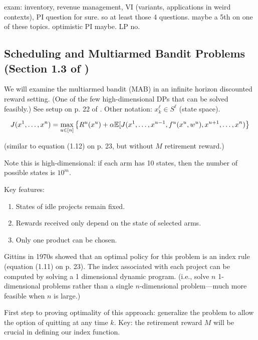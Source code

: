 exam: inventory, revenue management, VI (variants, applications in weird contexts), PI question for sure. so at least those 4 questions. maybe a 5th on one of these topics. optimistic PI maybe. LP no.



\subsection{Scheduling and Multiarmed Bandit Problems (Section 1.3 of  \citet{v2_bertsekas2012dynamic})}

We will examine the multiarmed bandit (MAB) in an infinite horizon discounted reward setting. (One of the few high-dimensional DPs that can be solved feasibly.) See setup on p. 22 of \citet{v2_bertsekas2012dynamic}. Other notation: \(x_k^\ell \in S^\ell\) (state space).

\[
J(x^1, \ldots, x^n) = \max_{u \in [n] }\left\{R^u(x^u) + \alpha \mathbb{E}[ J(x^1, \ldots, x^{u-1}, f^u(x^u, w^u), x^{u+1}, \ldots, x^n) \right\}
\]

(similar to equation (1.12) on p. 23, but without \(M\) retirement reward.)

Note this is high-dimensional: if each arm has 10 states, then the number of possible states is \(10^m\).

Key features: 

\begin{enumerate}

\item States of idle projects remain fixed.

\item Rewards received only depend on the state of selected arms.

\item Only one product can be chosen.

\end{enumerate}

Gittins in 1970s showed that an optimal policy for this problem is an index rule (equation (1.11) on p. 23). The index associated with each project can be computed by solving a 1 dimensional dynamic program. (i.e., solve \(n\) 1-dimensional problems rather than a single \(n\)-dimensional problem---much more feasible when \(n\) is large.)

First step to proving optimality of this approach: generalize the problem to allow the option of quitting at any time \(k\). Key: the retirement reward \(M\) will be crucial in defining our index function.

